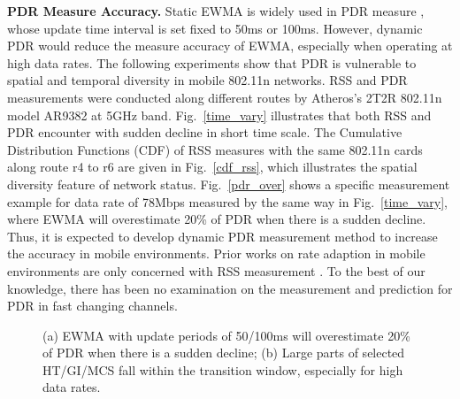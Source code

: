 \documentclass[draftclsnofoot,journal,onecolumn,11pt]{IEEEtran}
\begin{document}
\textbf{PDR Measure Accuracy.} Static EWMA is widely used in PDR measure \cite{ath9k} \cite{minstrel} \cite{wong2008wireless}, whose update time interval is set fixed to 50ms or 100ms. However, dynamic PDR would reduce the measure accuracy of EWMA, especially when operating at high data rates. The following experiments show that PDR is vulnerable to spatial and temporal diversity in mobile 802.11n networks. RSS and PDR measurements were conducted along different routes by Atheros's 2T2R 802.11n model AR9382 at 5GHz band. Fig.~\ref{time_vary} illustrates that both RSS and PDR encounter with sudden decline in short time scale. The Cumulative Distribution Functions (CDF) of RSS measures with the same 802.11n cards along route r4 to r6 are given in Fig.~\ref{cdf_rss}, which illustrates the spatial diversity feature of network status. Fig.~\ref{pdr_over} shows a specific measurement example for data rate of 78Mbps measured by the same way in Fig.~\ref{time_vary}, where EWMA will overestimate 20\% of PDR when there is a sudden decline. Thus, it is expected to develop dynamic PDR measurement method to increase the accuracy in mobile environments. Prior works on rate adaption in mobile environments are only concerned with RSS measurement \cite{chen2011ram} \cite{judd2008efficient}. To the best of our knowledge, there has been no examination on the measurement and prediction for PDR in fast changing channels.
\begin{figure}[!t]
\centerline{
}
\caption{(a) EWMA with update periods of 50/100ms will overestimate 20\% of PDR when there is a sudden decline; (b) Large parts of selected HT/GI/MCS fall within the transition window, especially for high data rates.}
\label{pdr-rss}
\end{figure}
\end{document}
